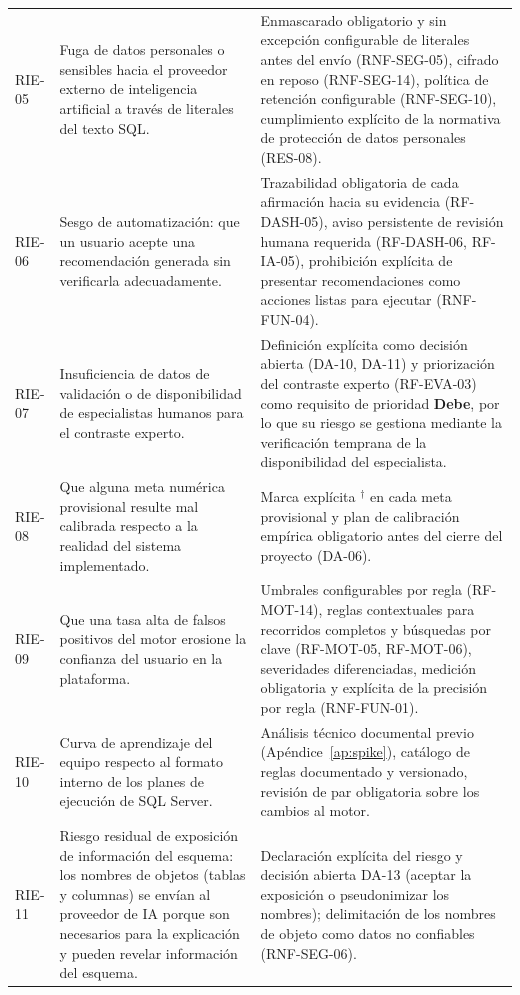 \documentclass[11pt,a4paper]{report}
\newcommand{\dagsym}{\ensuremath{^{\dagger}}}
\begin{document}
\begin{xltabular}{\linewidth}{@{}p{1.3cm}p{4.3cm}X@{}}
RIE-05 & Fuga de datos personales o sensibles hacia el proveedor externo de inteligencia artificial a trav\'es de literales del texto SQL. & Enmascarado obligatorio y sin excepci\'on configurable de literales antes del env\'io (RNF-SEG-05), cifrado en reposo (RNF-SEG-14), pol\'itica de retenci\'on configurable (RNF-SEG-10), cumplimiento expl\'icito de la normativa de protecci\'on de datos personales (RES-08). \\
RIE-06 & Sesgo de automatizaci\'on: que un usuario acepte una recomendaci\'on generada sin verificarla adecuadamente. & Trazabilidad obligatoria de cada afirmaci\'on hacia su evidencia (RF-DASH-05), aviso persistente de revisi\'on humana requerida (RF-DASH-06, RF-IA-05), prohibici\'on expl\'icita de presentar recomendaciones como acciones listas para ejecutar (RNF-FUN-04). \\
RIE-07 & Insuficiencia de datos de validaci\'on o de disponibilidad de especialistas humanos para el contraste experto. & Definici\'on expl\'icita como decisi\'on abierta (DA-10, DA-11) y priorizaci\'on del contraste experto (RF-EVA-03) como requisito de prioridad \textbf{Debe}, por lo que su riesgo se gestiona mediante la verificaci\'on temprana de la disponibilidad del especialista. \\
RIE-08 & Que alguna meta num\'erica provisional resulte mal calibrada respecto a la realidad del sistema implementado. & Marca expl\'icita \dagsym{} en cada meta provisional y plan de calibraci\'on emp\'irica obligatorio antes del cierre del proyecto (DA-06). \\
RIE-09 & Que una tasa alta de falsos positivos del motor erosione la confianza del usuario en la plataforma. & Umbrales configurables por regla (RF-MOT-14), reglas contextuales para recorridos completos y b\'usquedas por clave (RF-MOT-05, RF-MOT-06), severidades diferenciadas, medici\'on obligatoria y expl\'icita de la precisi\'on por regla (RNF-FUN-01). \\
RIE-10 & Curva de aprendizaje del equipo respecto al formato interno de los planes de ejecuci\'on de SQL Server. & An\'alisis t\'ecnico documental previo (Ap\'endice~\ref{ap:spike}), cat\'alogo de reglas documentado y versionado, revisi\'on de par obligatoria sobre los cambios al motor. \\
RIE-11 & Riesgo residual de exposici\'on de informaci\'on del esquema: los nombres de objetos (tablas y columnas) se env\'ian al proveedor de IA porque son necesarios para la explicaci\'on y pueden revelar informaci\'on del esquema. & Declaraci\'on expl\'icita del riesgo y decisi\'on abierta DA-13 (aceptar la exposici\'on o pseudonimizar los nombres); delimitaci\'on de los nombres de objeto como datos no confiables (RNF-SEG-06). \\

\end{xltabular}
\end{document}
